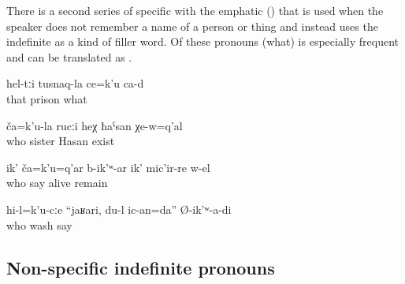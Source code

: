 There is a second series of specific  with the emphatic   () that is used when the speaker does not remember a name of a person or thing and instead uses the indefinite as a kind of filler word. Of these pronouns  (what) is especially frequent and can be translated as . 
%
\begin{exe}
	\ex	\label{ex:These are the prison's whatchamacallits}
	\gll	hel-tːi	tusnaq-la	ce=k'u	ca-d\\
		that	prison	what	\\
	\glt	{}

	\ex	\label{ex:This one his sister, that Hasan who lives down there}
	\gll	ča=k'u-la	rucːi	heχ	ħaˁsan	χe-w=q'al\\
		who	sister		Hasan	exist\\
	\glt	{}

	\ex	\label{ex:This one, how is he called, he is still alive}
	\gll	ik'	ča=k'u=q'ar	b-ik'ʷ-ar	ik'	mic'ir-re	w-el\\
			who	say		alive	remain\\
	\glt	{}

	\ex	\label{ex:To someone I (masc.) said, well I will wash him}
	\gll	hi-l=k'u-cːe	``jaʁari,	du-l	ic-an=da''	Ø-ik'ʷ-a-di\\
		who			wash	say\\
	\glt	{}
\end{exe}



\subsection{Non-specific indefinite pronouns}
\label{ssec:Non-specific indefinite pronouns}

